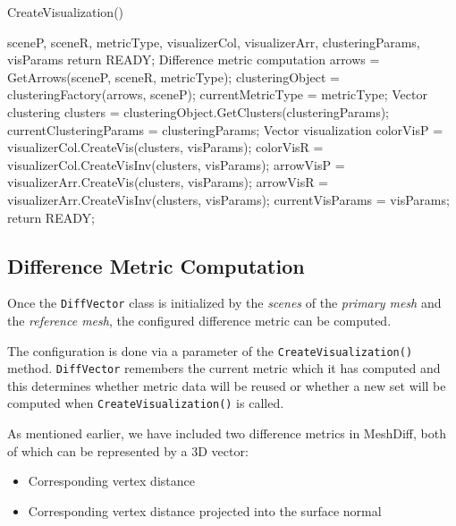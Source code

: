 \begin{algorithm}[H]
\caption{CreateVisualization()}
\label{algo:create_vis}
\begin{algorithmic}[1]

\Require sceneP, sceneR, metricType, visualizerCol, visualizerArr, clusteringParams, visParams
\Statex
{}
	\State return READY;
\EndIf
\Statex \Comment Difference metric computation
	\State arrows = GetArrows(sceneP, sceneR, metricType);
    \State clusteringObject = clusteringFactory(arrows, sceneP);
    \State currentMetricType = metricType;
\EndIf
\Statex \Comment Vector clustering
\State clusters = clusteringObject.GetClusters(clusteringParams);
\State currentClusteringParams = clusteringParams;
\Statex \Comment Vector visualization
	\State colorVisP = visualizerCol.CreateVis(clusters, visParams);
    \State colorVisR = visualizerCol.CreateVisInv(clusters, visParams);
\EndIf
{}
	\State arrowVisP = visualizerArr.CreateVis(clusters, visParams);
    \State arrowVisR = visualizerArr.CreateVisInv(clusters, visParams);
\EndIf
\State currentVisParams = visParams;
\Statex
\State return READY;
\end{algorithmic}
\end{algorithm}

\subsection{Difference Metric Computation}
\label{sec:analysis_metric}

Once the \verb+DiffVector+ class is initialized by the {\it scenes} of the {\it primary mesh} and the {\it reference mesh}, the configured difference metric can be computed.

The configuration is done via a parameter of the \verb+CreateVisualization()+ method. \verb+DiffVector+ remembers the current metric which it has computed and this determines whether metric data will be reused or whether a new set will be computed when \verb+CreateVisualization()+ is called.

As mentioned earlier, we have included two difference metrics in MeshDiff, both of which can be represented by a 3D vector:

\begin{itemize}
\item Corresponding vertex distance
\item Corresponding vertex distance projected into the surface normal
\end{itemize}

